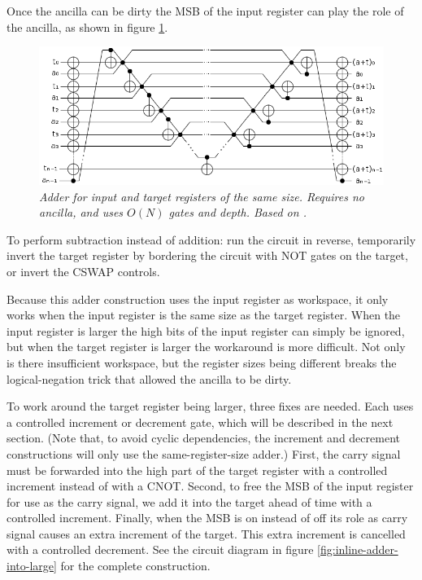 \documentclass[twocolumn]{article}
\begin{document}
Once the ancilla can be dirty the MSB of the input register can play the role of the ancilla, as shown in figure \ref{fig:inlineadder}.

\begin{figure}
  \centering
  \includegraphics[totalheight=3cm]{inline-adder.png}
  \caption{\em Adder for input and target registers of the same size.
  Requires no ancilla, and uses $O(N)$ gates and depth.
  Based on \cite{van2004, takahashi2005}.}
  \label{fig:inlineadder}
\end{figure}

To perform subtraction instead of addition: run the circuit in reverse, temporarily invert the target register by bordering the circuit with NOT gates on the target, or invert the CSWAP controls.

Because this adder construction uses the input register as workspace, it only works when the input register is the same size as the target register.
When the input register is larger the high bits of the input register can simply be ignored, but when the target register is larger the workaround is more difficult.
Not only is there insufficient workspace, but the register sizes being different breaks the logical-negation trick that allowed the ancilla to be dirty.

To work around the target register being larger, three fixes are needed.
Each uses a controlled increment or decrement gate, which will be described in the next section.
(Note that, to avoid cyclic dependencies, the increment and decrement constructions will only use the same-register-size adder.)
First, the carry signal must be forwarded into the high part of the target register with a controlled increment instead of with a CNOT.
Second, to free the MSB of the input register for use as the carry signal, we add it into the target ahead of time with a controlled increment.
Finally, when the MSB is on instead of off its role as carry signal causes an extra increment of the target.
This extra increment is cancelled with a controlled decrement.
See the circuit diagram in figure \ref{fig:inline-adder-into-large} for the complete construction.
\end{document}
